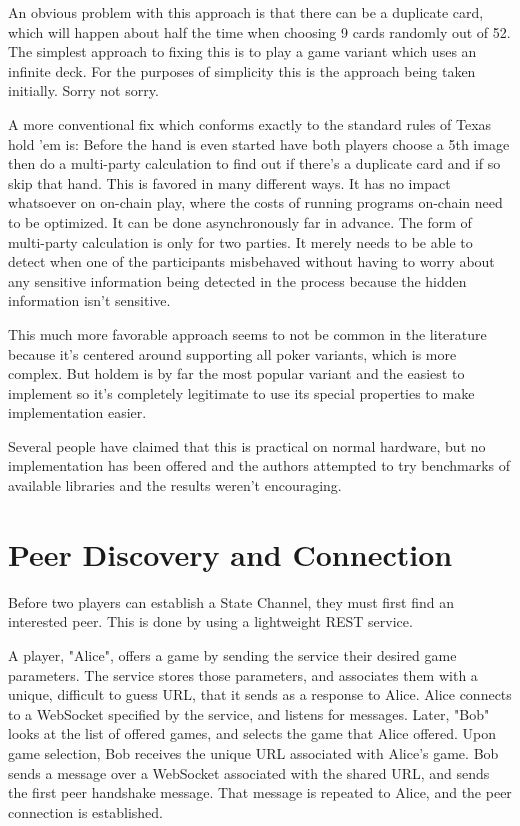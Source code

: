 \documentclass[a4paper]{article}
\begin{document}
\begin{multicols}{2}
An obvious problem with this approach is that there can be a duplicate card, which will happen about half the time when choosing 9 cards randomly out of 52. The simplest approach to fixing this is to play a game variant which uses an infinite deck. For the purposes of simplicity this is the approach being taken initially. Sorry not sorry.

A more conventional fix which conforms exactly to the standard rules of Texas hold 'em is: Before the hand is even started have both players choose a 5th image then do a multi-party calculation to find out if there’s a duplicate card and if so skip that hand. This is favored in many different ways. It has no impact whatsoever on on-chain play, where the costs of running programs on-chain need to be optimized. It can be done asynchronously far in advance. The form of multi-party calculation is only for two parties. It  merely needs to be able to detect when one of the participants misbehaved without having to worry about any sensitive information being detected in the process because the hidden information isn’t sensitive. 

This much more favorable approach seems to not be common in the literature because it’s centered around supporting all poker variants, which is more complex. But holdem is by far the most popular variant and the easiest to implement so it’s completely legitimate to use its special properties to make implementation easier.

Several people have claimed that this is practical on normal hardware, but no implementation has been offered and the authors attempted to try benchmarks of available libraries and the results weren’t encouraging.


\section{Peer Discovery and Connection}

Before two players can establish a State Channel, they must first find an interested peer. This is done by using a lightweight REST service.

A player, "Alice", offers a game by sending the service their desired game parameters. The service stores those parameters, and associates them with a unique, difficult to guess URL, that it sends as a response to Alice. Alice connects to a WebSocket specified by the service, and listens for messages. Later, "Bob" looks at the list of offered games, and selects the game that Alice offered. Upon game selection, Bob receives the unique URL associated with Alice's game. Bob sends a message over a WebSocket associated with the shared URL, and sends the first peer handshake message. That message is repeated to Alice, and the peer connection is established. 



\end{multicols}
\end{document}
